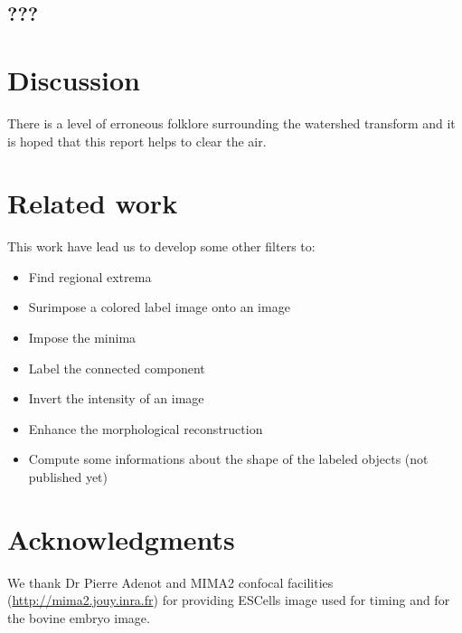 \documentclass{InsightArticle}
\begin{document}
\subsection{???}


\section{Discussion}
There is a level of erroneous folklore surrounding the watershed
transform and it is hoped that this report helps to clear the air.


\section{Related work}
This work have lead us to develop some other filters to:
\begin{itemize}
  \item Find regional extrema \cite{regionalExtrema}
  \item Surimpose a colored label image onto an image \cite{labelOverlay}
  \item Impose the minima \cite{minimaImposition}
  \item Label the connected component \cite{connectedComponent}
  \item Invert the intensity of an image \cite{invert}
  \item Enhance the morphological reconstruction \cite{recons}
  \item Compute some informations about the shape of the labeled objects (not published yet)
\end{itemize}

\section{Acknowledgments}
We thank Dr Pierre Adenot and MIMA2 confocal facilities
(\url{http://mima2.jouy.inra.fr}) for providing ESCells image used for
timing and for the bovine embryo image.


\appendix





\nocite{ITKSoftwareGuide}
\end{document}
